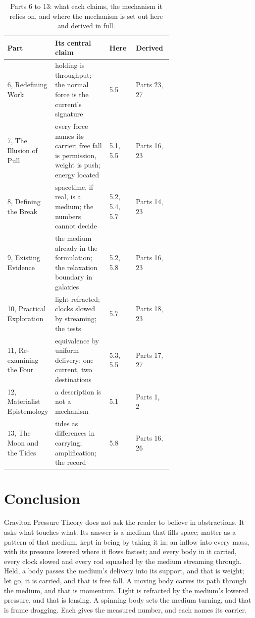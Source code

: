 \documentclass[11pt,a4paper]{article}
\begin{document}
\begin{table}[t]\centering\small
\caption{Parts 6 to 13: what each claims, the mechanism it relies on, and where the mechanism is set out here and derived in full.}
\begin{tabularx}{\linewidth}{@{}>{\raggedright}p{0.17\linewidth} >{\raggedright}p{0.33\linewidth} >{\raggedright}p{0.16\linewidth} X@{}}\toprule
\textbf{Part} & \textbf{Its central claim} & \textbf{Here} & \textbf{Derived}\\\midrule
6, Redefining Work & holding is throughput; the normal force is the current's signature & 5.5 & Parts 23, 27\\
7, The Illusion of Pull & every force names its carrier; free fall is permission, weight is push; energy located & 5.1, 5.5 & Parts 16, 23\\
8, Defining the Break & spacetime, if real, is a medium; the numbers cannot decide & 5.2, 5.4, 5.7 & Parts 14, 23\\
9, Existing Evidence & the medium already in the formulation; the relaxation boundary in galaxies & 5.2, 5.8 & Parts 16, 23\\
10, Practical Exploration & light refracted; clocks slowed by streaming; the tests & 5.7 & Parts 18, 23\\
11, Re-examining the Four & equivalence by uniform delivery; one current, two destinations & 5.3, 5.5 & Parts 17, 27\\
12, Materialist Epistemology & a description is not a mechanism & 5.1 & Parts 1, 2\\
13, The Moon and the Tides & tides as differences in carrying; amplification; the record & 5.8 & Parts 16, 26\\\bottomrule
\end{tabularx}\label{tab:map}\end{table}

\section*{Conclusion}

Graviton Pressure Theory does not ask the reader to believe in abstractions. It asks what touches what. Its answer is a medium that fills space; matter as a pattern of that medium, kept in being by taking it in; an inflow into every mass, with its pressure lowered where it flows fastest; and every body in it carried, every clock slowed and every rod squashed by the medium streaming through. Held, a body passes the medium's delivery into its support, and that is weight; let go, it is carried, and that is free fall. A moving body carves its path through the medium, and that is momentum. Light is refracted by the medium's lowered pressure, and that is lensing. A spinning body sets the medium turning, and that is frame dragging. Each gives the measured number, and each names its carrier.
\end{document}
